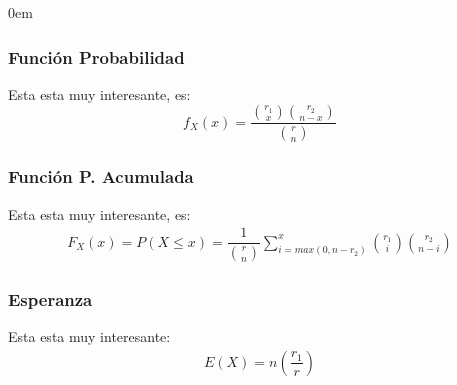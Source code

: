 \documentclass[12pt, fleqn]{report}                             %
\newenvironment{SmallIndentation}[1][0.75em]                    %
        {\begin{adjustwidth}{#1}{}\begin{footnotesize}}             %
        {\end{footnotesize}\end{adjustwidth}}                       %
\theoremstyle{break}                                            %
\newcommand{\Wrap}[1]           {\left( #1 \right)}             %
\newcommand{\pfrac}[2]      {\Wrap{\dfrac{#1}{#2}}}             %
\begin{document}
\begin{multicols}{2}
\begin{SmallIndentation}[0em]
                    \subsubsection{Función Probabilidad}

                        Esta esta muy interesante, es:
                        \begin{equation*}
                            f_X(x) = \dfrac{\binom{r_1}{x}\binom{r_2}{n - x}}{{r \choose n}}
                        \end{equation*}


                    \subsubsection{Función P. Acumulada}

                        Esta esta muy interesante, es:
                        \begin{align*}
                            F_X(x) 
                                = P(X \leq x)              
                                = \dfrac{1}{\binom{r}{n}}
                                    \displaystyle \sum_{i = max (0, n - r_2)}^x                
                                        \binom{r_1}{i} \binom{r_2}{n - i}
                        \end{align*}



                    \subsubsection{Esperanza}

                        Esta esta muy interesante:
                        \begin{align*}
                            E(X) = n \pfrac{r_1}{r}                    
                        \end{align*}



\end{SmallIndentation}
\end{multicols}
\end{document}
